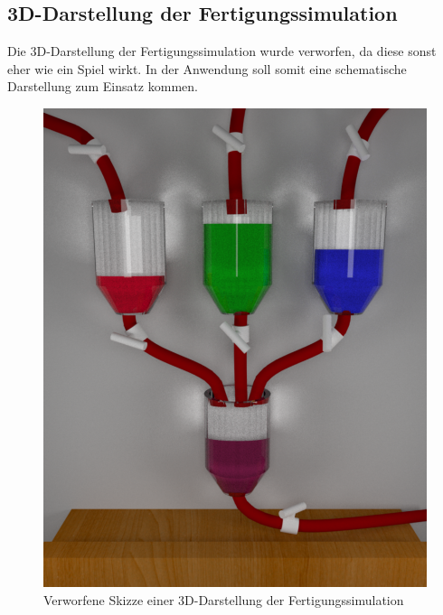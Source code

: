 \documentclass[parskip=full]{scrartcl}
\begin{document}
\subsection{3D-Darstellung der Fertigungssimulation}
Die 3D-Darstellung der \gls{Fertigungssimulation} wurde verworfen, da diese sonst eher wie ein Spiel wirkt.
In der Anwendung soll somit eine schematische Darstellung zum Einsatz kommen.
\begin{figure}[h!]
  \centering
  \includegraphics[scale=0.3]{./media/ui-sketch-server-3d.png}
  \caption{Verworfene Skizze einer 3D-Darstellung der Fertigungssimulation}
\end{figure}

\pagebreak
\printglossaries

{}
\listoffigures
\end{document}
